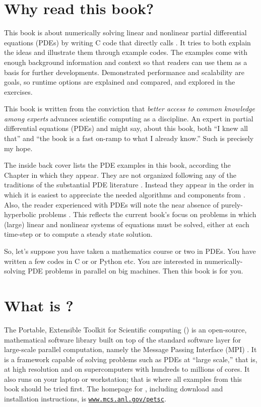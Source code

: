 
\section{Why read this book?}

This book is about numerically solving linear and nonlinear partial differential equations (PDEs) by writing C code \citep{KernighanRitchie1988} that directly calls \PETSc.  It tries to both explain the ideas and illustrate them through example codes.  The examples come with enough background information and context so that readers can use them as a basis for further developments.  Demonstrated performance and scalability are goals, so runtime options are explained and compared, and explored in the exercises.

This book is written from the conviction that \emph{better access to common knowledge among experts} advances scientific computing as a discipline.  An expert in partial differential equations (PDEs) and \PETSc might say, about this book, both ``I knew all that'' and ``the book is a fast on-ramp to what I already know.''  Such is precisely my hope.

The inside back cover lists the PDE examples in this book, according the Chapter in which they appear.  They are not organized following any of the traditions of the substantial PDE literature \citep[for just a start]{Evans2010,Ockendonetal2003}.  Instead they appear in the order in which it is easiest to appreciate the needed algorithms and components from \PETSc.  Also, the reader experienced with PDEs will note the near absence of purely-hyperbolic problems \citep[compare][]{LeVeque2002}.  This reflects the current book's focus on problems in which (large) linear and nonlinear systems of equations must be solved, either at each time-step or to compute a steady state solution.

So, let's suppose you have taken a mathematics course or two in PDEs.  You have written a few codes in C or \Matlab or Python etc.  You are interested in numerically-solving PDE problems in parallel on big machines.  Then this book is for you.

\section{What is \PETSc?}

The Portable, Extensible Toolkit for Scientific computing (\PETSc) is an open-source, mathematical software library built on top of the standard software layer for large-scale parallel computation, namely the Message Passing Interface (MPI) \citep{Groppetal1999}.  It is a framework capable of solving problems such as PDEs at ``large scale,'' that is, at high resolution and on supercomputers with hundreds to millions of cores.  It also runs on your laptop or workstation; that is where all examples from this book should be tried first.  The homepage for \PETSc, including download and installation instructions, is \href{http://www.mcs.anl.gov/petsc/index.html}{\texttt{www.mcs.anl.gov/petsc}}.

